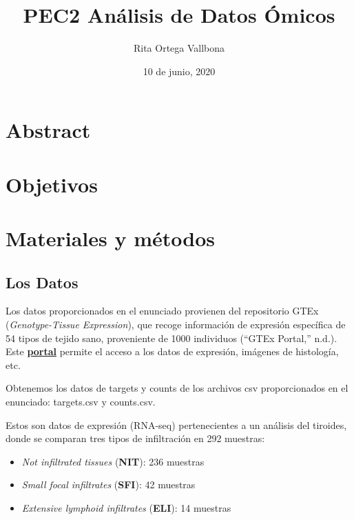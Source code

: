 \documentclass[
  english,
]{article}
\title{PEC2 Análisis de Datos Ómicos}
\author{Rita Ortega Vallbona}
\date{10 de junio, 2020}
\providecommand{\tightlist}{%
  \setlength{\itemsep}{0pt}\setlength{\parskip}{0pt}}
\begin{document}
\maketitle

{
\setcounter{tocdepth}{3}
\tableofcontents
}
\hypertarget{abstract}{%
\section{Abstract}\label{abstract}}

\hypertarget{objetivos}{%
\section{Objetivos}\label{objetivos}}

\hypertarget{materiales-y-muxe9todos}{%
\section{Materiales y métodos}\label{materiales-y-muxe9todos}}

\hypertarget{los-datos}{%
\subsection{Los Datos}\label{los-datos}}

Los datos proporcionados en el enunciado provienen del repositorio GTEx
(\emph{Genotype-Tissue Expression}), que recoge información de expresión
específica de 54 tipos de tejido sano, proveniente de 1000 individuos
(``GTEx Portal,'' n.d.). Este
\href{https://www.gtexportal.org/home/}{\textbf{portal}} permite el
acceso a los datos de expresión, imágenes de histología, etc.

Obtenemos los datos de targets y counts de los archivos csv
proporcionados en el enunciado: targets.csv y counts.csv.

Estos son datos de expresión (RNA-seq) pertenecientes a un análisis del
tiroides, donde se comparan tres tipos de infiltración en 292 muestras:

\begin{itemize}
\tightlist
\item
  \emph{Not infiltrated tissues} (\textbf{NIT}): 236 muestras
\item
  \emph{Small focal infiltrates} (\textbf{SFI}): 42 muestras
\item
  \emph{Extensive lymphoid infiltrates} (\textbf{ELI}): 14 muestras
\end{itemize}
\end{document}

